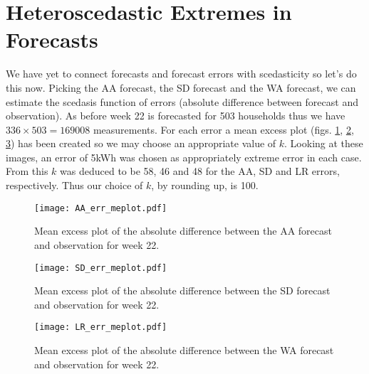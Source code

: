 \section{Heteroscedastic Extremes in Forecasts} \label{subsec:sced_forecast}

We have yet to connect forecasts and forecast errors with scedasticity so let's do this now. Picking the AA forecast, the SD forecast and the WA forecast, we can estimate the scedasis function of errors (absolute difference between forecast and observation). As before week 22 is forecasted for 503 households thus we have $336 \times 503 = 169008$ measurements. For each error a mean excess plot (figs. \ref{fig:AA_err_me}, \ref{fig:SD_err_me}, \ref{fig:LR_err_me}) has been created so we may choose an appropriate value of $k$. Looking at these images, an error of 5kWh was chosen as appropriately extreme error in each case. From this $k$ was deduced to be 58, 46 and 48 for the AA, SD and LR errors, respectively. Thus our choice of $k$, by rounding up, is 100. %

\begin{figure}
\centering
\texttt{[image: AA\_err\_meplot.pdf]}
\caption{\label{fig:AA_err_me} Mean excess plot of the absolute difference between the AA forecast and observation for week 22.}
\end{figure}

\begin{figure}
\centering
\texttt{[image: SD\_err\_meplot.pdf]}
\caption{\label{fig:SD_err_me} Mean excess plot of the absolute difference between the SD forecast and observation for week 22.}
\end{figure}

\begin{figure}
\centering
\texttt{[image: LR\_err\_meplot.pdf]}
\caption{\label{fig:LR_err_me} Mean excess plot of the absolute difference between the WA forecast and observation for week 22.}
\end{figure}

